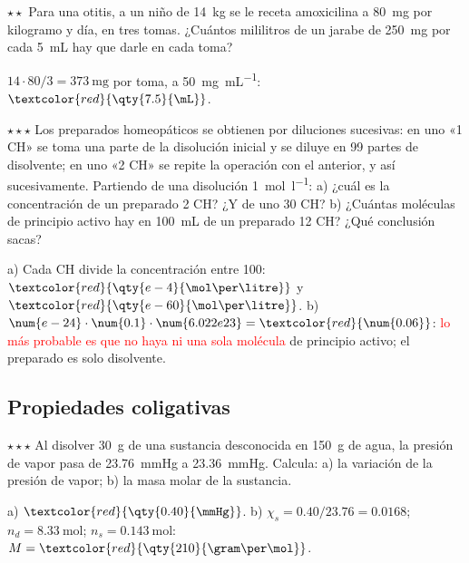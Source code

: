 \begin{exercise}
    \(\star\star\) Para una otitis, a un niño de \qty{14}{\kilo\gram} se le receta amoxicilina a \qty{80}{\milli\gram} por
    kilogramo y día, en tres tomas. ¿Cuántos mililitros de un jarabe de \qty{250}{\milli\gram} por cada \qty{5}{\mL} hay que darle
    en cada toma?
    \begin{solu}
        \(14 \cdot 80/3 = \qty{373}{\milli\gram}\) por toma, a \qty{50}{\milli\gram\per\mL}: \(\textcolor{red}{\qty{7.5}{\mL}}\).
    \end{solu}
\end{exercise}

\begin{exercise}
    \(\star\star\star\) Los preparados homeopáticos se obtienen por diluciones sucesivas: en uno «1 CH» se toma una parte de la
    disolución inicial y se diluye en 99 partes de disolvente; en uno «2 CH» se repite la operación con el anterior, y así
    sucesivamente. Partiendo de una disolución \qty{1}{\mol\per\litre}: a) ¿cuál es la concentración de un preparado 2 CH? ¿Y de
    uno 30 CH? b) ¿Cuántas moléculas de principio activo hay en \qty{100}{\mL} de un preparado 12 CH? ¿Qué conclusión sacas?
    \begin{solu}
        a) Cada CH divide la concentración entre 100: \(\textcolor{red}{\qty{e-4}{\mol\per\litre}}\) y \(\textcolor{red}{\qty{e-60}{\mol\per\litre}}\).
        b) \(\num{e-24} \cdot \num{0.1} \cdot \num{6.022e23} = \textcolor{red}{\num{0.06}}\): \textcolor{red}{lo más probable es que no
        haya ni una sola molécula} de principio activo; el preparado es solo disolvente.
    \end{solu}
\end{exercise}

\subsection{Propiedades coligativas}

\begin{exercise}
    \(\star\star\star\) Al disolver \qty{30}{\gram} de una sustancia desconocida en \qty{150}{\gram} de agua, la presión de vapor
    pasa de \qty{23.76}{\mmHg} a \qty{23.36}{\mmHg}. Calcula: a) la variación de la presión de vapor; b) la masa molar de la
    sustancia.
    \begin{solu}
        a) \(\textcolor{red}{\qty{0.40}{\mmHg}}\). b) \(\chi_s = \num{0.40}/\num{23.76} = \num{0.0168}\); \(n_d = \qty{8.33}{\mol}\);
        \(n_s = \qty{0.143}{\mol}\): \(M = \textcolor{red}{\qty{210}{\gram\per\mol}}\).
    \end{solu}
\end{exercise}

